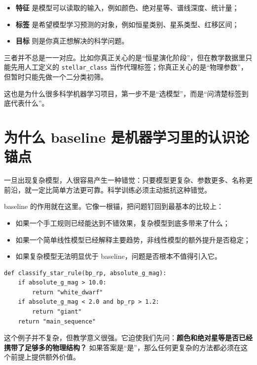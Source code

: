 \begin{itemize}
    \item \textbf{特征} 是模型可以读取的输入，例如颜色、绝对星等、谱线深度、统计量；
    \item \textbf{标签} 是希望模型学习预测的对象，例如恒星类别、星系类型、红移区间；
    \item \textbf{目标} 则是你真正想解决的科学问题。
\end{itemize}

三者并不总是一一对应。比如你真正关心的是“恒星演化阶段”，但在教学数据里只能先用人工定义的 \texttt{stellar\_class} 当作代理标签；你真正关心的是“物理参数”，但暂时只能先做一个二分类初筛。

这也是为什么很多科学机器学习项目，第一步不是“选模型”，而是“问清楚标签到底代表什么”。

\section{为什么 baseline 是机器学习里的认识论锚点}

一旦出现复杂模型，人很容易产生一种错觉：只要模型更复杂、参数更多、名称更前沿，就一定比简单方法更可靠。科学训练必须主动抵抗这种错觉。

baseline 的作用就在这里。它像一根锚，把问题钉回到最基本的比较上：

\begin{itemize}
    \item 如果一个手工规则已经能达到不错效果，复杂模型到底多带来了什么；
    \item 如果一个简单线性模型已经解释主要趋势，非线性模型的额外提升是否稳定；
    \item 如果复杂模型无法明显优于 baseline，问题是否根本不值得引入它。
\end{itemize}

\begin{examplebox}
\begin{lstlisting}[style=pythonstyle]
def classify_star_rule(bp_rp, absolute_g_mag):
    if absolute_g_mag > 10.0:
        return "white_dwarf"
    if absolute_g_mag < 2.0 and bp_rp > 1.2:
        return "giant"
    return "main_sequence"
\end{lstlisting}
\end{examplebox}

这个例子并不复杂，但教学意义很强。它迫使我们先问：\textbf{颜色和绝对星等是否已经携带了足够多的物理结构？} 如果答案是“是”，那么任何更复杂的方法都必须在这个前提上提供额外价值。

